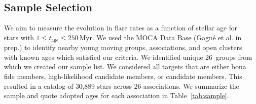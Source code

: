 \documentclass[twocolumn]{aastex631}
\begin{document}
\subsection{Sample Selection}



We aim to measure the evolution in flare rates as a function of stellar age for
stars with $1 \leq t_\textrm{age} \leq 250$\,Myr. We used the MOCA Data Base
(Gagné et al. in prep.) to identify nearby young moving groups, associations,
and open clusters with known ages which satisfied our criteria. We identified
unique 26~groups from which we created our sample list. We considered all targets
that are either bona fide members, high-likelihood candidate members, or candidate members.
This resulted in a catalog of 30,889 stars across 26 associations. We summarize
the sample and quote adopted ages for each association
in Table~\ref{tab:sample}.
\end{document}
